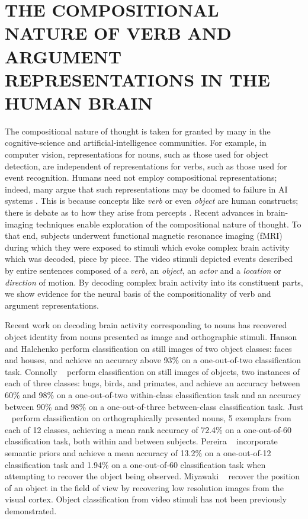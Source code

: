 \chapter{THE COMPOSITIONAL NATURE OF VERB AND ARGUMENT REPRESENTATIONS IN THE HUMAN BRAIN}
\label{chapter:nips2013d}

The compositional nature of thought is taken for granted by many in the
cognitive-science and artificial-intelligence communities.
%
For example, in computer vision, representations for nouns, such as those
used for object detection, are independent of representations for verbs, such
as those used for event recognition.
%
Humans need not employ compositional representations; indeed, many argue that
such representations may be doomed to failure in AI systems
\citep{brooks1991intelligence}.
%
This is because concepts like \emph{verb} or even \emph{object} are human
constructs; there is debate as to how they arise from percepts
\citep{smith1996origin}.
%
Recent advances in brain-imaging techniques enable exploration of the
compositional nature of thought.
%
To that end, subjects underwent functional magnetic resonance imaging (fMRI)
during which they were exposed to stimuli which evoke complex brain activity
which was decoded, piece by piece.
%
The video stimuli depicted events described by entire sentences composed of a
\emph{verb}, an \emph{object}, an \emph{actor} and a \emph{location} or
\emph{direction} of motion.
%
By decoding complex brain activity into its constituent parts, we show evidence
for the neural basis of the compositionality of verb and argument
representations.

Recent work on decoding brain activity corresponding to nouns has
recovered object identity from nouns presented as image and orthographic
stimuli.
%
Hanson and Halchenko \cite{hanson2009} perform classification on still
images of two object classes: faces and houses, and achieve an
accuracy above 93\% on a one-out-of-two classification task.
%
Connolly \etal\ \cite{connolly2012} perform classification on still
images of objects, two instances of each of three classes: bugs,
birds, and primates, and achieve an accuracy between 60\% and 98\% on
a one-out-of-two within-class classification task and an accuracy
between 90\% and 98\% on a one-out-of-three between-class
classification task.
%
Just \etal\ \cite{just2010} perform classification on orthographically presented nouns, 5
exemplars from each of 12 classes, achieving a mean rank accuracy of 72.4\% on
a one-out-of-60 classification task, both within and between subjects.
%
Pereira \etal\ \cite{pereira2012} incorporate semantic priors and achieve a mean accuracy
of 13.2\% on a one-out-of-12 classification task and 1.94\% on a one-out-of-60
classification task when attempting to recover the object being observed.
%
Miyawaki \etal\ \cite{miyawaki2008} recover the position of an object in the field of view by
recovering low resolution images from the visual cortex.
%
Object classification from video stimuli has not been previously demonstrated.

